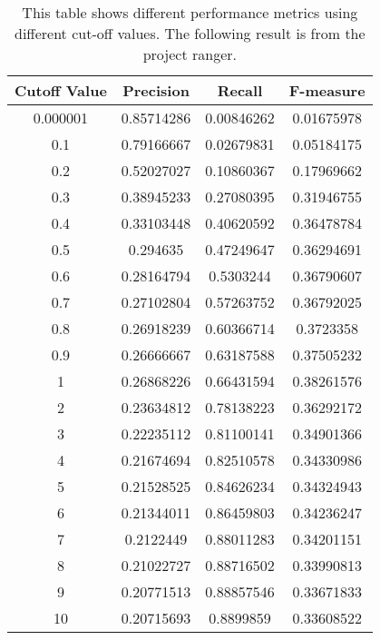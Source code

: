 \begin{table}[htbp]
\caption{This table shows different performance metrics using different cut-off values.
The following result is from the project ranger. }
\centering
\begin{tabular}{|c|c|c|c|}
\hline
\hline
Cutoff Value & Precision & Recall & F-measure \\ \hline \hline
0.000001 & 0.85714286 & 0.00846262 & 0.01675978 \\ \hline
0.1 & 0.79166667 & 0.02679831 & 0.05184175 \\ \hline
0.2 & 0.52027027 & 0.10860367 & 0.17969662 \\ \hline
0.3 & 0.38945233 & 0.27080395 & 0.31946755 \\ \hline
0.4 & 0.33103448 & 0.40620592 & 0.36478784 \\ \hline
0.5 & 0.294635 & 0.47249647 & 0.36294691 \\ \hline
0.6 & 0.28164794 & 0.5303244 & 0.36790607 \\ \hline
0.7 & 0.27102804 & 0.57263752 & 0.36792025 \\ \hline
0.8 & 0.26918239 & 0.60366714 & 0.3723358 \\ \hline
0.9 & 0.26666667 & 0.63187588 & 0.37505232 \\ \hline
1 & 0.26868226 & 0.66431594 & 0.38261576 \\ \hline
2 & 0.23634812 & 0.78138223 & 0.36292172 \\ \hline
3 & 0.22235112 & 0.81100141 & 0.34901366 \\ \hline
4 & 0.21674694 & 0.82510578 & 0.34330986 \\ \hline
5 & 0.21528525 & 0.84626234 & 0.34324943 \\ \hline
6 & 0.21344011 & 0.86459803 & 0.34236247 \\ \hline
7 & 0.2122449 & 0.88011283 & 0.34201151 \\ \hline
8 & 0.21022727 & 0.88716502 & 0.33990813 \\ \hline
9 & 0.20771513 & 0.88857546 & 0.33671833 \\ \hline
10 & 0.20715693 & 0.8899859 & 0.33608522 \\ \hline \hline
\end{tabular}%
\label{tab:rq_2}
\end{table}